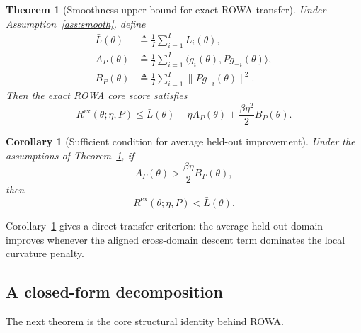 \documentclass{article}
\newtheorem{theorem}{Theorem}
\newtheorem{corollary}{Corollary}
\newcommand{\rowa}{\textup{\textsc{ROWA}}}
\begin{document}
\begin{theorem}[Smoothness upper bound for exact \rowa{} transfer]
\label{thm:smooth}
Under Assumption~\ref{ass:smooth}, define
\begin{align}
    \bar L(\theta) &\triangleq \frac{1}{I}\sum_{i=1}^{I} L_i(\theta),\\
    A_P(\theta) &\triangleq \frac{1}{I}\sum_{i=1}^{I}\langle g_i(\theta), P g_{-i}(\theta)\rangle,\\
    B_P(\theta) &\triangleq \frac{1}{I}\sum_{i=1}^{I}\|P g_{-i}(\theta)\|^2.
\end{align}
Then the exact \rowa{} core score satisfies
\begin{equation}
    R^{\mathrm{ex}}(\theta;\eta,P)
    \le
    \bar L(\theta) - \eta A_P(\theta) + \frac{\beta \eta^2}{2} B_P(\theta).
    \label{eq:smooth_upper}
\end{equation}
\end{theorem}

\begin{corollary}[Sufficient condition for average held-out improvement]
\label{cor:improve}
Under the assumptions of Theorem~\ref{thm:smooth}, if
\begin{equation}
    A_P(\theta) > \frac{\beta \eta}{2} B_P(\theta),
\end{equation}
then
\begin{equation}
    R^{\mathrm{ex}}(\theta;\eta,P) < \bar L(\theta).
\end{equation}
\end{corollary}

Corollary~\ref{cor:improve} gives a direct transfer criterion: the average held-out domain improves whenever the aligned cross-domain descent term dominates the local curvature penalty.

\subsection{A closed-form decomposition}

The next theorem is the core structural identity behind \rowa{}.
\end{document}
